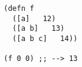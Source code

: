 \begin{lstlisting}[style=reclojureClojure,frame=single]
(defn f
  ([a]   12)
  ([a b]   13)
  ([a b c]   14))

(f 0 0) ;; --> 13
\end{lstlisting}
